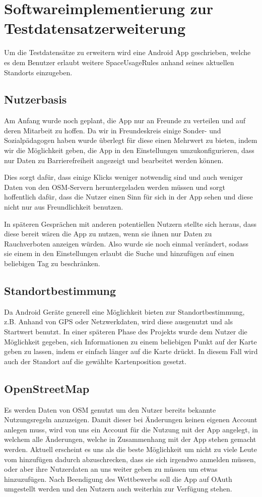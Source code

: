 \section{Softwareimplementierung zur Testdatensatzerweiterung}
\label{sec:HelferApp}
Um die Testdatensätze zu erweitern wird eine Android App geschrieben, welche es dem
Benutzer erlaubt weitere SpaceUsageRules anhand seines aktuellen Standorts einzugeben.

\subsection{Nutzerbasis}
Am Anfang wurde noch geplant, die App nur an Freunde zu verteilen und auf deren Mitarbeit zu hoffen.
Da wir in Freundeskreis einige Sonder- und Sozialpädagogen haben wurde überlegt für diese einen Mehrwert zu bieten,
indem wir die Möglichkeit geben, die App in den Einstellungen umzukonfigurieren, dass nur Daten zu Barrierefreiheit angezeigt und bearbeitet werden können.

Dies sorgt dafür, dass einige Klicks weniger notwendig sind und auch weniger Daten von den OSM-Servern heruntergeladen werden müssen
und sorgt hoffentlich dafür, dass die Nutzer einen Sinn für sich in der App sehen und diese nicht nur aus Freundlichkeit benutzen.

In späteren Gesprächen mit anderen potentiellen Nutzern stellte sich heraus, dass diese bereit wären die App zu nutzen,
wenn sie ihnen nur Daten zu Rauchverboten anzeigen würden.
Also wurde sie noch einmal verändert, sodass sie einem in den Einstellungen erlaubt die Suche und hinzufügen auf einen beliebigen Tag zu beschränken.

\subsection{Standortbestimmung}
Da Android Geräte generell eine Möglichkeit bieten zur Standortbestimmung, z.B. Anhand von GPS oder Netzwerkdaten,
wird diese ausgenutzt und als Startwert benutzt.
In einer späteren Phase des Projekts wurde dem Nutzer die Möglichkeit gegeben, sich Informationen zu einem beliebigen Punkt auf der Karte geben zu lassen,
indem er einfach länger auf die Karte drückt. In diesem Fall wird auch der Standort auf die gewählte Kartenposition gesetzt.

\subsection{OpenStreetMap}
Es werden Daten von OSM genutzt um den Nutzer bereits bekannte Nutzungsregeln anzuzeigen.
Damit dieser bei Änderungen keinen eigenen Account anlegen muss, wird von uns ein Account für die Nutzung mit der App angelegt,
in welchem alle Änderungen, welche in Zusammenhang mit der App stehen gemacht werden.
Aktuell erscheint es uns als die beste Möglichkeit
um nicht zu viele Leute vom hinzufügen dadurch abzuschrecken, dass sie sich irgendwo anmelden müssen,
oder aber ihre Nutzerdaten an uns weiter geben zu müssen um etwas hinzuzufügen.
Nach Beendigung des Wettbewerbs soll die App auf OAuth umgestellt werden und den Nutzern auch weiterhin zur Verfügung stehen.

